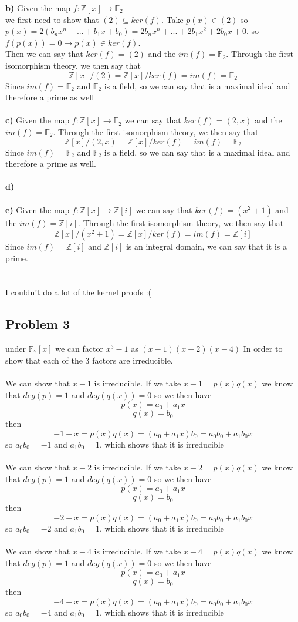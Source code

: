 \documentclass[12pt]{article}
\newcommand{\Z}{\mathbb{Z}}
\newcommand{\F}{\mathbb{F}}
\begin{document}
\textbf{b) } Given the map $f: \Z[x] \rightarrow \F_2$ \\
we first need to show that $(2) \subseteq ker(f)$. Take $p(x) \in (2)$ so $p(x) = 2(b_nx^n+...+b_1x+b_0) = 2b_nx^n+...+2b_1x^2+2b_0x + 0$. so $f(p(x)) = 0 \rightarrow p(x) \in ker(f)$.\\
Then we can say that $ker(f) = (2)$ and the $im(f) = \F_2$. Through the first isomorphism theory, we then say that 
\[ \Z[x]/(2)  = \Z[x]/ker(f) = im(f) = \F_2 \]
Since $im(f) = \F_2$ and $\F_2$ is a field, so we can say that is a maximal ideal and therefore a prime as well \\\\
\textbf{c) } Given the map $f: \Z[x] \rightarrow \F_2$ we can say that $ker(f) = (2,x)$ and the $im(f) = \F_2$. Through the first isomorphism theory, we then say that 
\[ \Z[x]/(2,x)  = \Z[x]/ker(f) = im(f) = \F_2 \]
Since $im(f) = \F_2$ and $\F_2$ is a field, so we can say that is a maximal ideal and therefore a prime as well.\\\\
\textbf{d) } \\\\
\textbf{e) } Given the map $f: \Z[x] \rightarrow \Z[i]$ we can say that $ker(f) = (x^2+1)$ and the $im(f) = \Z[i]$. Through the first isomorphism theory, we then say that 
\[ \Z[x]/(x^2+1)  = \Z[x]/ker(f) = im(f) = \Z[i] \]
Since $im(f) = \Z[i]$ and $\Z[i]$ is an integral domain, we can say that it is a prime. \\\\\\

I couldn't do a lot of the kernel proofs :(
\newpage
\subsection*{Problem 3}
under $\F_7[x]$ we can factor $x^3-1$ as $(x-1)(x-2)(x-4)$ In order to show that each of the 3 factors are irreducible.\\\\
We can show that $x-1$ is irreducible. If we take $x-1 = p(x)q(x)$ we know that $deg(p) = 1$ and $deg(q(x)) = 0$ so we then have
\[ p(x) = a_0 + a_1x \]
\[ q(x) = b_0 \]
then
\[ -1 + x = p(x)q(x) = (a_0 + a_1x)b_0 = a_0b_0 + a_1b_0x\]
so $a_0b_0 = -1$ and $a_1b_0 = 1$. which shows that it is irreducible \\\\
We can show that $x-2$ is irreducible. If we take $x-2 = p(x)q(x)$ we know that $deg(p) = 1$ and $deg(q(x)) = 0$ so we then have
\[ p(x) = a_0 + a_1x \]
\[ q(x) = b_0 \]
then
\[ -2 + x = p(x)q(x) = (a_0 + a_1x)b_0 = a_0b_0 + a_1b_0x\]
so $a_0b_0 = -2$ and $a_1b_0 = 1$. which shows that it is irreducible \\\\
We can show that $x-4$ is irreducible. If we take $x-4 = p(x)q(x)$ we know that $deg(p) = 1$ and $deg(q(x)) = 0$ so we then have
\[ p(x) = a_0 + a_1x \]
\[ q(x) = b_0 \]
then
\[ -4 + x = p(x)q(x) = (a_0 + a_1x)b_0 = a_0b_0 + a_1b_0x\]
so $a_0b_0 = -4$ and $a_1b_0 = 1$. which shows that it is irreducible
\newpage
\end{document}
